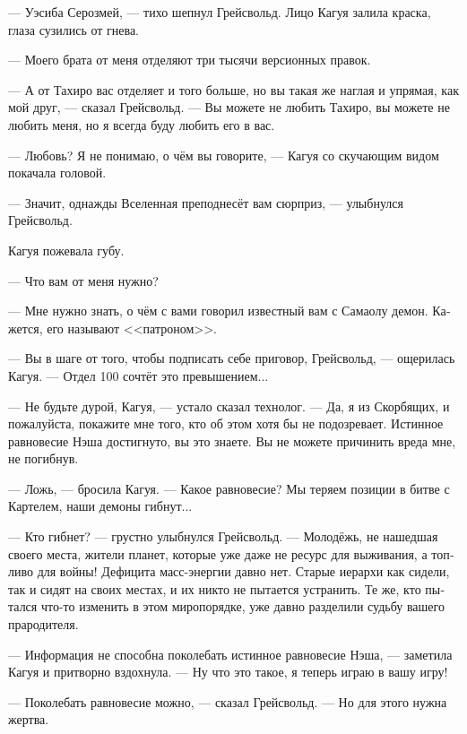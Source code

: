 \documentclass[a4paper,12pt,fleqn]{book}\usepackage{polyglossia}\setdefaultlanguage[babelshorthands=true]{russian}\setotherlanguage{english}\defaultfontfeatures{Ligatures=TeX,Mapping=tex-text}\usepackage{xcolor}\newcommand{\ml}[3]{#2}
\begin{document}
--- Уэсиба Серозмей, --- тихо шепнул Грейсвольд.
Лицо Кагуя залила краска, глаза сузились от гнева.

--- Моего брата от меня отделяют три тысячи версионных правок.

--- А от Тахиро вас отделяет и того больше, но вы такая же наглая и упрямая, как мой друг, --- сказал Грейсвольд.
--- Вы можете не любить Тахиро, вы можете не любить меня, но я всегда буду любить его в вас.

--- Любовь?
Я не понимаю, о чём вы говорите, --- Кагуя со скучающим видом покачала головой.

--- Значит, однажды Вселенная преподнесёт вам сюрприз, --- улыбнулся Грейсвольд.

Кагуя пожевала губу.

--- Что вам от меня нужно?

--- Мне нужно знать, о чём с вами говорил известный вам с Самаолу демон.
Кажется, его называют <<патроном>>.

--- Вы в шаге от того, чтобы подписать себе приговор, Грейсвольд, --- ощерилась Кагуя.
--- Отдел 100 сочтёт это превышением...

--- Не будьте дурой, Кагуя, --- устало сказал технолог.
--- Да, я из Скорбящих, и пожалуйста, покажите мне того, кто об этом хотя бы не подозревает.
Истинное равновесие Нэша достигнуто, вы это знаете.
Вы не можете причинить вреда мне, не погибнув.

--- Ложь, --- бросила Кагуя.
--- Какое равновесие?
Мы теряем позиции в битве с Картелем, наши демоны гибнут...

\ml{$0$}
{--- Кто гибнет? --- грустно улыбнулся Грейсвольд.}
{``But who tends to die?'' Grejsvolt sadly smiled.}
\ml{$0$}
{--- Молодёжь, не нашедшая своего места, жители планет, которые уже даже не ресурс для выживания, а топливо для войны!}
{``Young who failed to find their place, and dwellers of planets---not as vital resource, but as fuel for war!}
\ml{$0$}
{Дефицита масс-энергии давно нет.}
{Mass-energy deficiency is long gone.}
Старые иерархи как сидели, так и сидят на своих местах, и их никто не пытается устранить.
Те же, кто пытался что-то изменить в этом миропорядке, уже давно разделили судьбу вашего прародителя.

--- Информация не способна поколебать истинное равновесие Нэша, --- заметила Кагуя и притворно вздохнула.
--- Ну что это такое, я теперь играю в вашу игру!

--- Поколебать равновесие можно, --- сказал Грейсвольд.
--- Но для этого нужна жертва.
\end{document}

